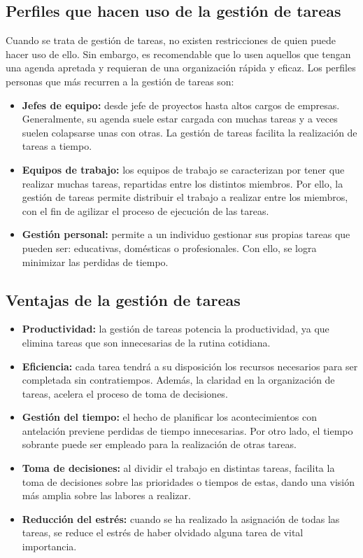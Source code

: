 \subsection{Perfiles que hacen uso de la gestión de tareas}
Cuando se trata de gestión de tareas, no existen restricciones de quien puede hacer uso de ello. Sin embargo, es recomendable que lo usen aquellos que tengan una agenda apretada y requieran de una organización rápida y eficaz. Los perfiles personas que más recurren a la gestión de tareas son:

\begin{itemize}
    \item \textbf{Jefes de equipo:} desde jefe de proyectos hasta altos cargos de empresas. Generalmente, su agenda suele estar cargada con muchas tareas y a veces suelen colapsarse unas con otras. La gestión de tareas facilita la realización de tareas a tiempo.
    \item \textbf{Equipos de trabajo:} los equipos de trabajo se caracterizan por tener que realizar muchas tareas, repartidas entre los distintos miembros. Por ello, la gestión de tareas permite distribuir el trabajo a realizar entre los miembros, con el fin de agilizar el proceso de ejecución de las tareas.
    \item \textbf{Gestión personal:} permite a un individuo gestionar sus propias tareas que pueden ser: educativas, domésticas o profesionales. Con ello, se logra minimizar las perdidas de tiempo.
\end{itemize}

\subsection{Ventajas de la gestión de tareas}
\begin{itemize}
    \item \textbf{Productividad:} la gestión de tareas potencia la productividad, ya que elimina tareas que son innecesarias de la rutina cotidiana. 
    \item \textbf{Eficiencia:} cada tarea tendrá a su disposición los recursos necesarios para ser completada sin contratiempos. Además, la claridad en la organización de tareas, acelera el proceso de toma de decisiones.
    \item \textbf{Gestión del tiempo:} el hecho de planificar los acontecimientos con antelación previene perdidas de tiempo innecesarias. Por otro lado, el tiempo sobrante puede ser empleado para la realización de otras tareas.
    \item \textbf{Toma de decisiones:} al dividir el trabajo en distintas tareas, facilita la toma de decisiones sobre las prioridades o tiempos de estas, dando una visión más amplia sobre las labores a realizar.
    \item \textbf{Reducción del estrés:} cuando se ha realizado la asignación de todas las tareas, se reduce el estrés de haber olvidado alguna tarea de vital importancia.
    
\end{itemize}

